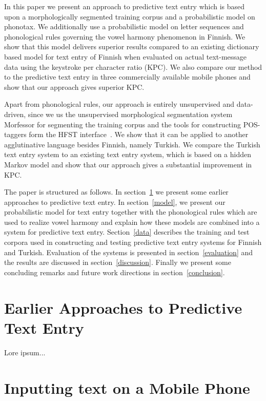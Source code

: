 \documentclass{llncs}
\begin{document}
In this paper we present an approach to predictive text entry which is
based upon a morphologically segmented training corpus and a
probabilistic model on phonotax. We additionally use a probabilistic
model on letter sequences and phonological rules governing the vowel
harmony phenomenon in Finnish. We show that this model delivers
superior results compared to an existing dictionary based model for
text entry of Finnish when evaluated on actual text-message data using
the keystroke per character ratio (KPC). We also compare our method to
the predictive text entry in three commercially available mobile
phones and show that our approach gives superior KPC.

Apart from phonological rules, our approach is entirely unsupervised
and data-driven, since we us the unsupervised morphological
segmentation system Morfessor \cite{Creutz07ACMTSLP} for segmenting
the training corpus and the tools for constructing POS-taggers form
the HFST interface~\cite{hfst/2011}. We show that it can be applied to
another agglutinative language besides Finnish, namely Turkish. We
compare the Turkish text entry system to an existing text entry
system, which is based on a hidden Markov model and show that our
approach gives a substantial improvement in KPC.

The paper is structured as follows. In section~\ref{earlier-work} we
present some earlier approaches to predictive text entry. In
section~\ref{model}, we present our probabilistic model for text entry
together with the phonological rules which are used to realize vowel
harmony and explain how these models are combined into a system for
predictive text entry. Section~\ref{data} describes the training and
test corpora used in constructing and testing predictive text entry
systems for Finnish and Turkish. Evaluation of the systems is
presented in section~\ref{evaluation} and the results are discussed in
section~\ref{discussion}. Finally we present some concluding remarks
and future work directions in section~\ref{conclusion}.

\section{Earlier Approaches to Predictive Text Entry}\label{earlier-work}

Lore ipsum...

\section{Inputting text on a Mobile Phone}
\end{document}
